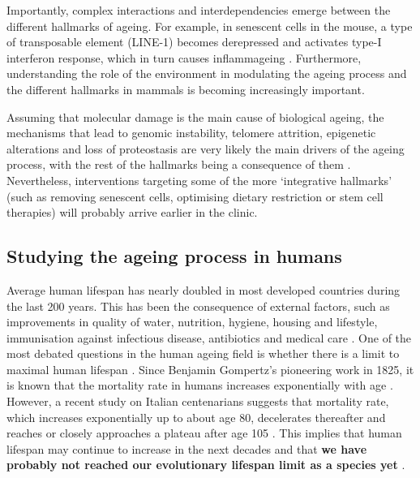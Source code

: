 Importantly, complex interactions and interdependencies emerge between the different hallmarks of ageing. For example, in senescent cells in the mouse, a type of transposable element (LINE-1) becomes derepressed and activates type-I interferon response, which in turn causes inflammageing \citep{DeCecco2019}. Furthermore, understanding the role of the environment in modulating the ageing process and the different hallmarks in mammals is becoming increasingly important.  

\bigskip

Assuming that molecular damage is the main cause of biological ageing, the mechanisms that lead to genomic instability, telomere attrition, epigenetic alterations and loss of proteostasis are very likely the main drivers of the ageing process, with the rest of the hallmarks being a consequence of them \citep{Lopez-Otin2013}. Nevertheless, interventions targeting some of the more `integrative hallmarks' (such as removing senescent cells, optimising dietary restriction or stem cell therapies) will probably arrive earlier in the clinic.

\smallskip

\subsection{Studying the ageing process in humans}

\smallskip

Average human lifespan has nearly doubled in most developed countries during the last 200 years. This has been the consequence of external factors, such as improvements in quality of water, nutrition, hygiene, housing and lifestyle, immunisation against infectious disease, antibiotics and medical care \citep{Partridge2018}. One of the most debated questions in the human ageing field is whether there is a limit to maximal human lifespan \citep{Dong2016}. Since Benjamin Gompertz's pioneering work in 1825, it is known that the mortality rate in humans increases exponentially with age \citep{Gompertz1825}. However, a recent study on Italian centenarians suggests that mortality rate, which increases exponentially up to about age 80, decelerates thereafter and reaches or closely approaches a plateau after age 105 \citep{Barbi2018}. This implies that human lifespan may continue to increase in the next decades and that \textbf{we have probably not reached our evolutionary lifespan limit as a species yet} \citep{Barbi2018,Kontis2017}. 

\bigskip

